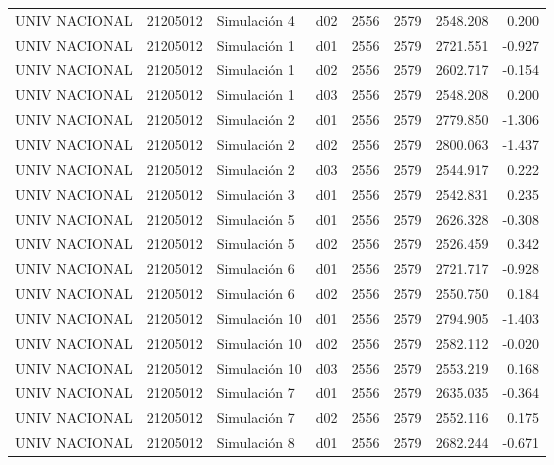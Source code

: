 \begin{landscape}
\begin{longtable}{lrlp{2cm}p{2cm}p{3cm}p{2cm}r}
           UNIV NACIONAL &  21205012 &   Simulación 4 &   d02 &      2556 &     2579 &  2548.208 &     0.200 \\
           UNIV NACIONAL &  21205012 &   Simulación 1 &   d01 &      2556 &     2579 &  2721.551 &    -0.927 \\
           UNIV NACIONAL &  21205012 &   Simulación 1 &   d02 &      2556 &     2579 &  2602.717 &    -0.154 \\
           UNIV NACIONAL &  21205012 &   Simulación 1 &   d03 &      2556 &     2579 &  2548.208 &     0.200 \\
           UNIV NACIONAL &  21205012 &   Simulación 2 &   d01 &      2556 &     2579 &  2779.850 &    -1.306 \\
           UNIV NACIONAL &  21205012 &   Simulación 2 &   d02 &      2556 &     2579 &  2800.063 &    -1.437 \\
           UNIV NACIONAL &  21205012 &   Simulación 2 &   d03 &      2556 &     2579 &  2544.917 &     0.222 \\
           UNIV NACIONAL &  21205012 &   Simulación 3 &   d01 &      2556 &     2579 &  2542.831 &     0.235 \\
           UNIV NACIONAL &  21205012 &   Simulación 5 &   d01 &      2556 &     2579 &  2626.328 &    -0.308 \\
           UNIV NACIONAL &  21205012 &   Simulación 5 &   d02 &      2556 &     2579 &  2526.459 &     0.342 \\
           UNIV NACIONAL &  21205012 &   Simulación 6 &   d01 &      2556 &     2579 &  2721.717 &    -0.928 \\
           UNIV NACIONAL &  21205012 &   Simulación 6 &   d02 &      2556 &     2579 &  2550.750 &     0.184 \\
           UNIV NACIONAL &  21205012 &  Simulación 10 &   d01 &      2556 &     2579 &  2794.905 &    -1.403 \\
           UNIV NACIONAL &  21205012 &  Simulación 10 &   d02 &      2556 &     2579 &  2582.112 &    -0.020 \\
           UNIV NACIONAL &  21205012 &  Simulación 10 &   d03 &      2556 &     2579 &  2553.219 &     0.168 \\
           UNIV NACIONAL &  21205012 &   Simulación 7 &   d01 &      2556 &     2579 &  2635.035 &    -0.364 \\
           UNIV NACIONAL &  21205012 &   Simulación 7 &   d02 &      2556 &     2579 &  2552.116 &     0.175 \\
           UNIV NACIONAL &  21205012 &   Simulación 8 &   d01 &      2556 &     2579 &  2682.244 &    -0.671 \\

\end{longtable}
\end{landscape}
